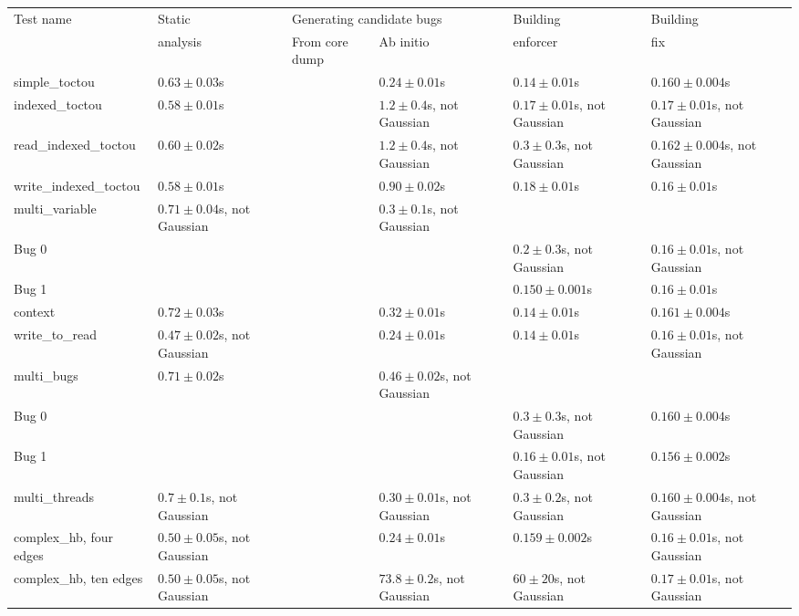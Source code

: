 \begin{tabular}{l|p{3.6cm}|p{3.6cm}|p{3.6cm}|p{3.6cm}|p{3.6cm}}
Test name              & Static                  & \multicolumn{2}{l|}{Generating candidate bugs} & Building & Building \\
\cline{3-4}            & analysis                & From core dump & Ab initio                     & enforcer & fix      \\
\hline
\hline{}simple\_toctou         & $0.63 \pm 0.03$s     &        & $0.24 \pm 0.01$s     & $0.14 \pm 0.01$s     & $0.160 \pm 0.004$s   \\
\hline{}indexed\_toctou        & $0.58 \pm 0.01$s     &        & $1.2 \pm 0.4$s, not Gaussian & $0.17 \pm 0.01$s, not Gaussian & $0.17 \pm 0.01$s, not Gaussian \\
\hline{}read\_indexed\_toctou  & $0.60 \pm 0.02$s     &        & $1.2 \pm 0.4$s, not Gaussian & $0.3 \pm 0.3$s, not Gaussian & $0.162 \pm 0.004$s, not Gaussian \\
\hline{}write\_indexed\_toctou & $0.58 \pm 0.01$s     &        & $0.90 \pm 0.02$s     & $0.18 \pm 0.01$s     & $0.16 \pm 0.01$s     \\
\hline{}multi\_variable        & $0.71 \pm 0.04$s, not Gaussian &        & $0.3 \pm 0.1$s, not Gaussian & \\
\hspace{20pt}Bug 0     & & & & $0.2 \pm 0.3$s, not Gaussian & $0.16 \pm 0.01$s, not Gaussian \\
\hspace{20pt}Bug 1     & & & & $0.150 \pm 0.001$s   & $0.16 \pm 0.01$s     \\
\hline{}context                & $0.72 \pm 0.03$s     &        & $0.32 \pm 0.01$s     & $0.14 \pm 0.01$s     & $0.161 \pm 0.004$s   \\
\hline{}write\_to\_read        & $0.47 \pm 0.02$s, not Gaussian &        & $0.24 \pm 0.01$s     & $0.14 \pm 0.01$s     & $0.16 \pm 0.01$s, not Gaussian \\
\hline{}multi\_bugs            & $0.71 \pm 0.02$s     &        & $0.46 \pm 0.02$s, not Gaussian & \\
\hspace{20pt}Bug 0     & & & & $0.3 \pm 0.3$s, not Gaussian & $0.160 \pm 0.004$s   \\
\hspace{20pt}Bug 1     & & & & $0.16 \pm 0.01$s, not Gaussian & $0.156 \pm 0.002$s   \\
\hline{}multi\_threads         & $0.7 \pm 0.1$s, not Gaussian &        & $0.30 \pm 0.01$s, not Gaussian & $0.3 \pm 0.2$s, not Gaussian & $0.160 \pm 0.004$s, not Gaussian \\
\hline{}complex\_hb, four edges & $0.50 \pm 0.05$s, not Gaussian &        & $0.24 \pm 0.01$s     & $0.159 \pm 0.002$s   & $0.16 \pm 0.01$s, not Gaussian \\
\hline{}complex\_hb, ten edges & $0.50 \pm 0.05$s, not Gaussian &        & $73.8 \pm 0.2$s, not Gaussian & $60 \pm 20$s, not Gaussian & $0.17 \pm 0.01$s, not Gaussian \\
\end{tabular}

